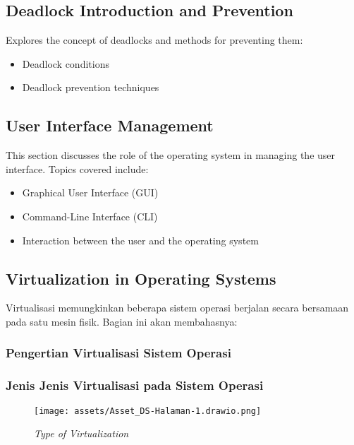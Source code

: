 \documentclass[12pt]{article}
\begin{document}
\subsection{Deadlock Introduction and Prevention}
Explores the concept of deadlocks and methods for preventing them:
\begin{itemize}
    \item Deadlock conditions
    \item Deadlock prevention techniques
\end{itemize}

\subsection{User Interface Management}
This section discusses the role of the operating system in managing the user interface. Topics covered include:
\begin{itemize}
    \item Graphical User Interface (GUI)
    \item Command-Line Interface (CLI)
    \item Interaction between the user and the operating system
\end{itemize}

\subsection{Virtualization in Operating Systems}
    Virtualisasi memungkinkan beberapa sistem operasi berjalan secara bersamaan pada satu mesin fisik. Bagian ini akan membahasnya:
    
\subsubsection{Pengertian Virtualisasi Sistem Operasi}

\subsubsection{Jenis Jenis Virtualisasi pada Sistem Operasi}

\begin{figure}[h!]
    \centering
    \texttt{[image: assets/Asset\_DS-Halaman-1.drawio.png]}
    \caption{\textit{Type of Virtualization}}
\end{figure}
\end{document}
